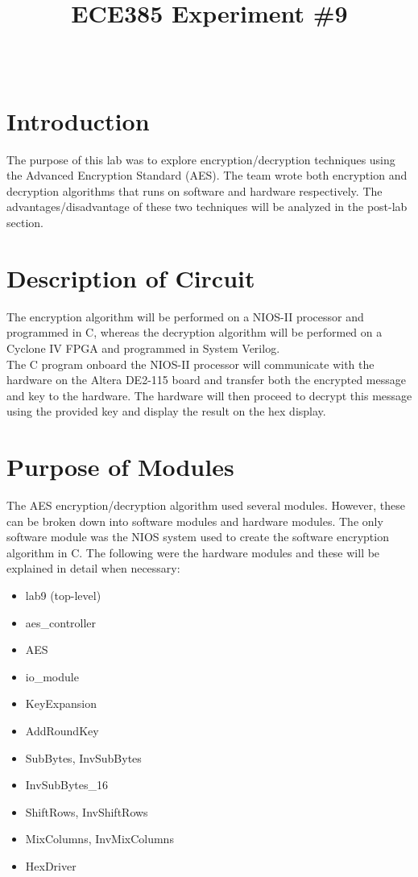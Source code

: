 \documentclass[journal, twocolumn, final,11pt,letterpaper]{IEEEtran}
\title{ECE385 Experiment \#9
	}
\author{
\IEEEauthorblockN{Eric Meyers, Ryan Helsdingen}\\
\IEEEauthorblockA{Section ABG; TAs: Ben Delay, Shuo Liu \\
April 13th, 2016 \\
emeyer7, helsdin2}}
\begin{document}
	
\maketitle
\singlespacing

\section{Introduction}
The purpose of this lab was to explore encryption/decryption techniques using the Advanced Encryption Standard (AES). The team wrote both encryption and decryption algorithms that runs on software and hardware respectively. The advantages/disadvantage of these two techniques will be analyzed in the post-lab section. 

\section{Description of Circuit}
The encryption algorithm will be performed on a NIOS-II processor and programmed in C, whereas the decryption algorithm will be performed on a Cyclone IV FPGA and programmed in System Verilog. \\

The C program onboard the NIOS-II processor  will communicate with the hardware on the Altera DE2-115 board and transfer both the encrypted message and key to the hardware. The hardware will then proceed to decrypt this message using the provided key and display the result on the hex display.

\section{Purpose of Modules}
The AES encryption/decryption algorithm used several modules. However, these can be broken down into software modules and hardware modules. The only software module was the NIOS system used to create the software encryption algorithm in C. The following were the hardware modules and these will be explained in detail when necessary:
\begin{itemize}
	\item lab9 (top-level)
	\item aes\_controller
	\item AES
	\item io\_module
	\item KeyExpansion
	\item AddRoundKey
	\item SubBytes, InvSubBytes
	\item InvSubBytes\_16
	\item ShiftRows, InvShiftRows
	\item MixColumns, InvMixColumns
	\item HexDriver
\end{itemize}
\end{document}
